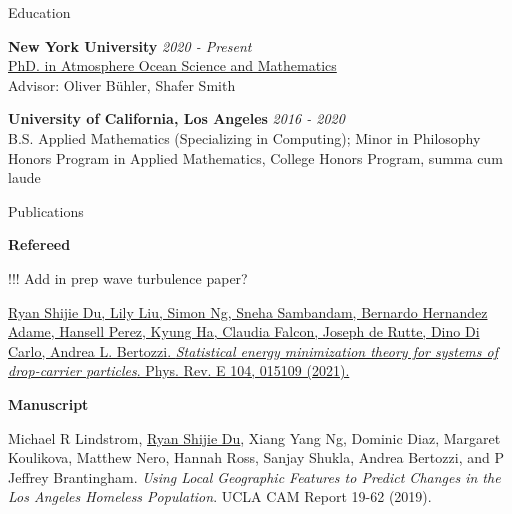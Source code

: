 \documentclass{resume} %
\begin{document}

\begin{rSection}{Education}

{\bf New York University} \hfill {\em 2020 - Present} \\
\href{https://caos.cims.nyu.edu/dynamic/phd-program/overview}{PhD. in Atmosphere Ocean Science and Mathematics}\\
Advisor: Oliver B\"uhler, Shafer Smith

{\bf University of California, Los Angeles} \hfill {\em 2016 - 2020} \\
B.S. Applied Mathematics (Specializing in Computing); Minor in Philosophy\\
Honors Program in Applied Mathematics, College Honors Program, summa cum laude

\end{rSection}


\begin{rSection}{Publications}

{\bf Refereed}
\begin{etaremune}
    \item !!! Add in prep wave turbulence paper?
    \item \href{https://doi.org/10.1103/PhysRevE.104.015109}{\underline{Ryan Shijie Du}, Lily Liu, Simon Ng, Sneha Sambandam, Bernardo Hernandez Adame, Hansell Perez, Kyung Ha, Claudia Falcon, Joseph de Rutte, Dino Di Carlo, Andrea L. Bertozzi. \textit{Statistical energy minimization theory for systems of drop-carrier particles}. Phys. Rev. E 104, 015109 (2021).}
\end{etaremune}

{\bf Manuscript}
\begin{etaremune}
    \item Michael R Lindstrom, \underline{Ryan Shijie Du}, Xiang Yang Ng, Dominic Diaz, Margaret Koulikova, Matthew Nero, Hannah Ross, Sanjay Shukla, Andrea Bertozzi, and P Jeffrey Brantingham. \textit{Using Local Geographic Features to Predict Changes in the Los Angeles Homeless Population}. UCLA CAM Report 19-62 (2019).
\end{etaremune}
\end{rSection}

\end{document}
